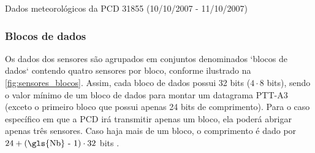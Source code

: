 \begin{quadro}[H]
\caption{Dados meteorológicos da PCD 31855 (10/10/2007 - 11/10/2007)}\label{quadro:dados-meteorologicos}

\end{quadro}


\subsubsection{Blocos de dados}

Os dados dos sensores são agrupados em conjuntos denominados `blocos de dados` contendo quatro sensores por bloco, conforme ilustrado na \autoref{fig:sensores_blocos}. Assim, cada bloco de dados possui 32 bits ($4 \cdot 8$ bits), sendo o valor mínimo de um bloco de dados para montar um datagrama \gls{PTT-A3} (exceto o primeiro bloco que possui apenas 24 bits de comprimento). Para o caso específico em que a PCD irá transmitir apenas um bloco, ela poderá abrigar apenas três sensores. Caso haja mais de um bloco, o comprimento é dado por $24 + (\text{\gls{Nb} - 1}) \cdot 32$ bits \textcite{cnes_services_and_message_formats_ed2_rev2_2006}.

